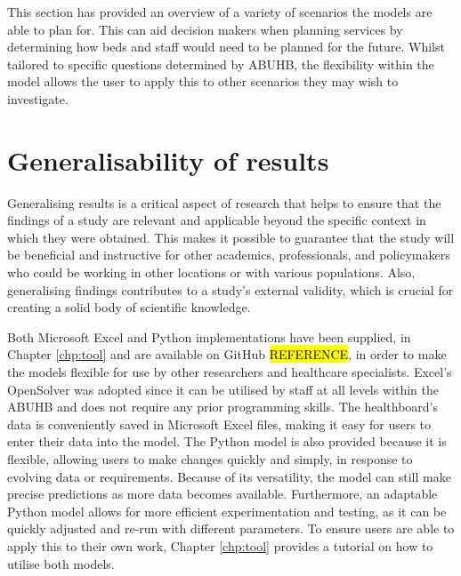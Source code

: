 \documentclass[../thesis.tex]{subfiles}
\begin{document}
This section has provided an overview of a variety of scenarios the models are able to plan for. This can aid decision makers when planning services by determining how beds and staff would need to be planned for the future. Whilst tailored to specific questions determined by ABUHB, the flexibility within the model allows the user to apply this to other scenarios they may wish to investigate.



\section{Generalisability of results}\label{sec:generalization}

Generalising results is a critical aspect of research that helps to ensure that the findings of a study are relevant and applicable beyond the specific context in which they were obtained. This makes it possible to guarantee that the study will be beneficial and instructive for other academics, professionals, and policymakers who could be working in other locations or with various populations. Also, generalising findings contributes to a study's external validity, which is crucial for creating a solid body of scientific knowledge.

Both Microsoft Excel and Python implementations have been supplied, in Chapter \ref{chp:tool} and are available on GitHub \cite{}\hl{REFERENCE}, in order to make the models flexible for use by other researchers and healthcare specialists. Excel's OpenSolver was adopted since it can be utilised by staff at all levels within the ABUHB and does not require any prior programming skills. The healthboard's data is conveniently saved in Microsoft Excel files, making it easy for users to enter their data into the model. The Python model is also provided because it is flexible, allowing users to make changes quickly and simply, in response to evolving data or requirements. Because of its versatility, the model can still make precise predictions as more data becomes available. Furthermore, an adaptable Python model allows for more efficient experimentation and testing, as it can be quickly adjusted and re-run with different parameters. To ensure users are able to apply this to their own work, Chapter \ref{chp:tool} provides a tutorial on how to utilise both models.
\end{document}
